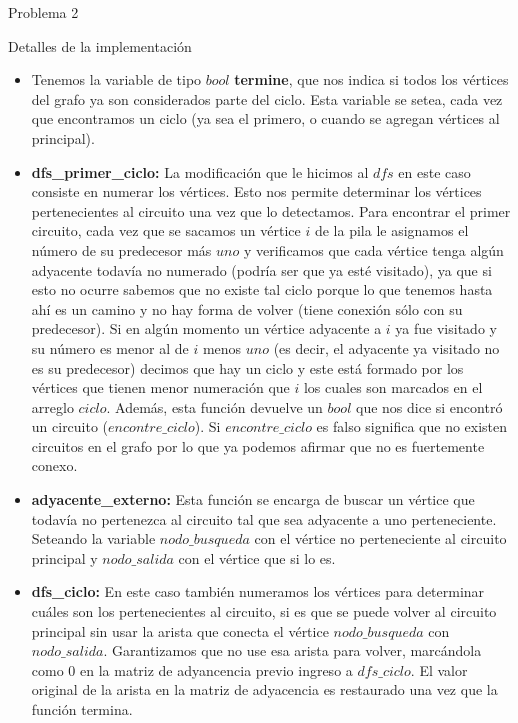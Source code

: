 \begin{section}{Problema 2}
\begin{subsection}{Detalles de la implementación}
		\begin{itemize}
			\item Tenemos la variable de tipo $bool$ \textbf{termine}, que nos indica si todos los vértices del grafo ya son considerados parte del ciclo. Esta variable se setea, cada vez que encontramos un ciclo (ya sea el primero, o cuando se agregan vértices al principal).

			\item \textbf{dfs\_primer\_ciclo:} La modificación que le hicimos al $dfs$ en este caso consiste en numerar los vértices. Esto nos permite determinar los vértices pertenecientes al circuito una vez que lo detectamos. Para encontrar el primer circuito, cada vez que se sacamos un vértice $i$ de la pila le asignamos el número de su predecesor más $uno$ y verificamos que cada vértice tenga algún adyacente todavía no numerado (podría ser que ya esté visitado), ya que si esto no ocurre sabemos que no existe tal ciclo porque lo que tenemos hasta ahí es un camino y no hay forma de volver (tiene conexión sólo con su predecesor). Si en algún momento un vértice adyacente a $i$ ya fue visitado y su número es menor al de $i$ menos $uno$ (es decir, el adyacente ya visitado no es su predecesor) decimos que hay un ciclo y este está formado por los vértices que tienen menor numeración que $i$ los cuales son marcados en el arreglo $ciclo$. Además, esta función devuelve un $bool$ que nos dice si encontró un circuito ($encontre\_ciclo$). Si $encontre\_ciclo$ es falso significa que no existen circuitos en el grafo por lo que ya podemos afirmar que no es fuertemente conexo.

			\item \textbf{adyacente\_externo:} Esta función se encarga de buscar un vértice que todavía no pertenezca al circuito tal que sea adyacente a uno perteneciente. Seteando la variable $nodo\_busqueda$ con el vértice no perteneciente al circuito principal y $nodo\_salida$ con el vértice que si lo es.
		
			\item \textbf{dfs\_ciclo:} En este caso también numeramos los vértices para determinar cuáles son los pertenecientes al circuito, si es que se puede volver al circuito principal sin usar la arista que conecta el vértice $nodo\_busqueda$ con $nodo\_salida$. Garantizamos que no use esa arista para volver, marcándola como $0$ en la matriz de adyancencia previo ingreso a $dfs\_ciclo$. El valor original de la arista en la matriz de adyacencia es restaurado una vez que la función termina.
			

\end{itemize}
\end{subsection}
\end{section}

